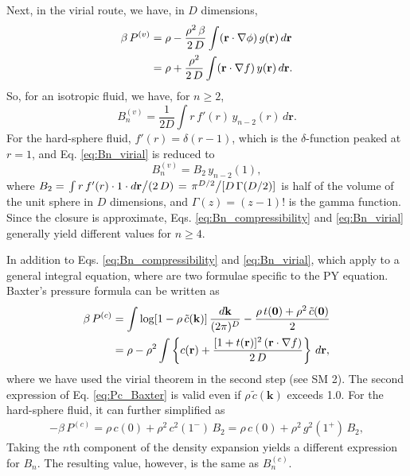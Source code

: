 \documentclass[aip,jcp,preprint,superscriptaddress,showpacs,preprintnumbers,amsmath,amssymb]{revtex4-1}
\newcommand{\vct}[1]{\mathbf{#1}}
\providecommand{\vr}{} %
\renewcommand{\vr}{\vct{r}}
\newcommand{\vk}{\vct{k}}
\newcommand{\dvk}{\frac{d\vk}{(2\pi)^D}}
\begin{document}
Next, in the virial route,
we have, in $D$ dimensions,
%
%
%
\begin{align}
\beta \, P^{(v)}
&=
\rho
-
\frac{ \rho^2 \, \beta }
     {  2 \, D }
\int (\vr \cdot \nabla \phi) \, g(\vr) \, d\vr
\notag \\
&=
\rho
+
\frac{ \rho^2 }
     { 2 \, D }
\int (\vr \cdot \nabla f) \, y(\vr) \, d\vr.
\label{eq:P_virial}
\end{align}
%
%
%
So, for an isotropic fluid,
we have, for $n \ge 2$,
%
%
%
\begin{equation}
B_n^{(v)}
=
\frac{1}{2D}
\int r \, f'(r) \, y_{n-2}(r) \, d\vr.
\label{eq:Bn_virial}
\end{equation}
%
%
%
For the hard-sphere fluid,
$f'(r) = \delta(r - 1)$,
which is the $\delta$-function peaked at $r = 1$,
and Eq. \eqref{eq:Bn_virial} is reduced to
%
%
%
\[
B_n^{(v)} = B_2 \, y_{n-2}(1),
\]
%
%
%
where
$B_2 =
\left.
  \int r \, f'(r) \cdot 1 \cdot d\vr
\middle/
  (2 \, D)
\right.
=
\left.
  \pi^{D/2}
\middle/
  [ D \, \Gamma(D/2) ]
\right.$
is half of the volume of the unit sphere in $D$ dimensions,
and $\Gamma(z) = (z-1)!$ is the gamma function.
%
Since the closure is approximate,
Eqs. \eqref{eq:Bn_compressibility} and \eqref{eq:Bn_virial}
generally yield different values for $n \ge 4$.



In addition to
Eqs. \eqref{eq:Bn_compressibility} and \eqref{eq:Bn_virial},
which apply to a general integral equation,
where are two formulae specific to the PY equation.
%
Baxter's pressure formula\cite{baxterpressure}
can be written as
%
%
%
\begin{align}
\beta \, P^{(c)}
&=
\int \log[ 1 - \rho \, \tilde c(\vk) ] \, \dvk
-\frac{ \rho \, t(\vct{0}) + \rho^2 \, \tilde c(\vct 0) } { 2 }
\notag \\
&=
\rho
-
\rho^2
\int
\left\{
  c(\vr)
  + \frac{ [ 1 + t(\vr)]^2 \, (\vr \cdot \nabla f) } { 2 \, D }
\right\}
\, d\vr,
\label{eq:Pc_Baxter}
\end{align}
%
%
%
where we have used the virial theorem\cite{
rushbrooke1953, uhlenbeck1962}
in the second step (see SM 2).
%
The second expression of Eq. \eqref{eq:Pc_Baxter}
is valid even if $\rho \, \tilde c(\vk)$ exceeds 1.0.
%
For the hard-sphere fluid,
it can further simplified as
%
\begin{align*}
-\beta \, P^{(c)}
=
\rho \, c(0) + \rho^2 \, c^2(1^-) \, B_2
=
\rho \, c(0) + \rho^2 \, g^2(1^+) \, B_2,
\end{align*}
%
Taking the $n$th component of the density expansion yields
a different expression for $B_n$.
%
The resulting value, however, is the same as $B_n^{(c)}$\cite{baxterpressure}.
\end{document}
